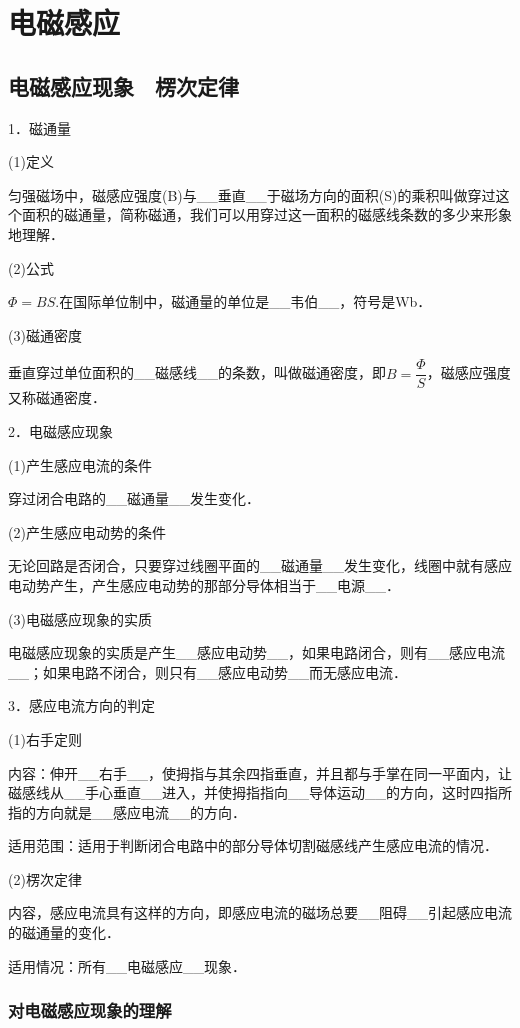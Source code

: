 \chapter{电磁感应}
\section{电磁感应现象　楞次定律}

1．磁通量

(1)定义

匀强磁场中，磁感应强度(B)与\_\_垂直\_\_于磁场方向的面积(S)的乘积叫做穿过这个面积的磁通量，简称磁通，我们可以用穿过这一面积的磁感线条数的多少来形象地理解．

(2)公式

$\Phi=BS.$在国际单位制中，磁通量的单位是\_\_韦伯\_\_，符号是Wb．

(3)磁通密度

垂直穿过单位面积的\_\_磁感线\_\_的条数，叫做磁通密度，即$B=\dfrac{\Phi}{S}$，磁感应强度又称磁通密度．

2．电磁感应现象

(1)产生感应电流的条件

穿过闭合电路的\_\_磁通量\_\_发生变化．

(2)产生感应电动势的条件

无论回路是否闭合，只要穿过线圈平面的\_\_磁通量\_\_发生变化，线圈中就有感应电动势产生，产生感应电动势的那部分导体相当于\_\_电源\_\_．

(3)电磁感应现象的实质

电磁感应现象的实质是产生\_\_感应电动势\_\_，如果电路闭合，则有\_\_感应电流\_\_；如果电路不闭合，则只有\_\_感应电动势\_\_而无感应电流．

3．感应电流方向的判定

(1)右手定则

内容：伸开\_\_右手\_\_，使拇指与其余四指垂直，并且都与手掌在同一平面内，让磁感线从\_\_手心垂直\_\_进入，并使拇指指向\_\_导体运动\_\_的方向，这时四指所指的方向就是\_\_感应电流\_\_的方向．

适用范围：适用于判断闭合电路中的部分导体切割磁感线产生感应电流的情况．

(2)楞次定律

内容，感应电流具有这样的方向，即感应电流的磁场总要\_\_阻碍\_\_引起感应电流的磁通量的变化．

适用情况：所有\_\_电磁感应\_\_现象．
\newpage
\subsection{对电磁感应现象的理解}

